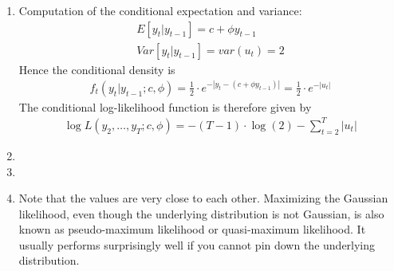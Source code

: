 \begin{enumerate}

\item
Computation of the conditional expectation and variance:
\begin{gather*}
E[y_{t}|y_{t-1}] = c + \phi y_{t-1}
\\
Var[y_{t}|y_{t-1}] = var(u_t) = 2
\end{gather*}
Hence the conditional density is
\begin{align*}
f_t(y_{t}|y_{t-1}; c, \phi) = \frac{1}{2} \cdot e^{-|y_{t} -(c + \phi y_{t-1})|} = \frac{1}{2} \cdot e^{-|u_t|}
\end{align*}
The conditional log-likelihood function is therefore given by
\begin{align*}
\log L(y_{2}, \dots, y_{T};c, \phi) =-(T-1) \cdot \log(2) - \sum_{t=2}^{T} |u_{t}|
\end{align*}

\item


\item



\item
Note that the values are very close to each other.
Maximizing the Gaussian likelihood, even though the underlying distribution is not Gaussian,
  is also known as pseudo-maximum likelihood or quasi-maximum likelihood.
It usually performs surprisingly well if you cannot pin down the underlying distribution.
\end{enumerate}